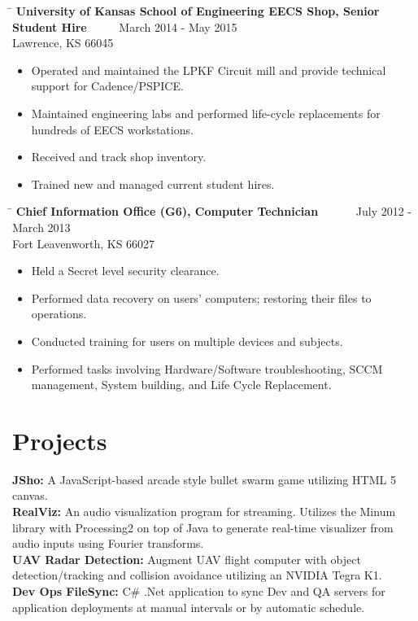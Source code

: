 \documentclass{res}
\begin{document}
\begin{resume}
\begin{itemize}
	\end{itemize}
   \begin{tabbing}
   \hspace{5.5in}\= \kill
   {\bf University of Kansas School of Engineering EECS Shop, Senior Student Hire}  \>~~~~~March 2014 - May 2015\\
   Lawrence, KS 66045
   \end{tabbing}\vspace{-10pt}
	\begin{itemize}
		\item Operated and maintained the LPKF Circuit mill and provide technical support for Cadence/PSPICE.
		\item Maintained engineering labs and performed life-cycle replacements for hundreds of EECS workstations.
		\item Received and track shop inventory.
		\item Trained new and managed current student hires.\vspace{-15pt}
	\end{itemize}
   \begin{tabbing}
	\hspace{5.5in}\= \kill
	{\bf Chief Information Office (G6), Computer Technician}  \>~~~~~~July 2012 - March 2013\\
	Fort Leavenworth, KS 66027
\end{tabbing}\vspace{-10pt}
	\begin{itemize}
		\item Held a Secret level security clearance.
		\item Performed data recovery on users' computers; restoring their files to operations.
		\item Conducted training for users on multiple devices and subjects.
		\item Performed tasks involving Hardware/Software troubleshooting, SCCM management, System building, and Life Cycle Replacement.\vspace{-10pt}
	\end{itemize}

\section{Projects}          
{\textbf{JSho:} A JavaScript-based arcade style bullet swarm game utilizing HTML 5 canvas.\\\textbf{RealViz:} An audio visualization program for streaming. Utilizes the Minum library with Processing2 on top of Java to generate real-time visualizer from audio inputs using Fourier transforms.\\\textbf{UAV Radar Detection:} Augment UAV flight computer with object detection/tracking and collision avoidance utilizing an NVIDIA Tegra K1.\\\textbf{Dev Ops FileSync:} C\# .Net application to sync Dev and QA servers for application deployments at manual intervals or by automatic schedule.}
 
\end{resume}
\end{document}
